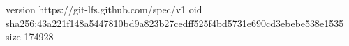 version https://git-lfs.github.com/spec/v1
oid sha256:43a221f148a5447810bd9a823b27cedff525f4bd5731e690cd3ebebe538e1535
size 174928
